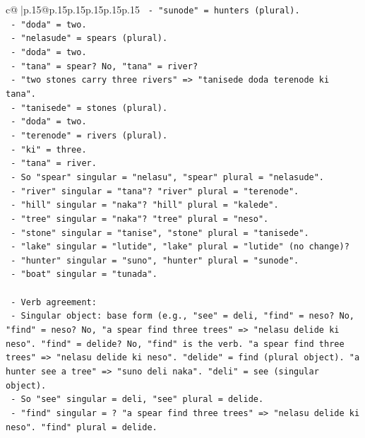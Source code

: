 \documentclass{article}
\begin{document}
{\begin{supertabular}{c@{$\;$}|p{.15\linewidth}@{}p{.15\linewidth}p{.15\linewidth}p{.15\linewidth}p{.15\linewidth}p{.15\linewidth}}
{{{\texttt{       {-} "sunode" = hunters (plural).} \\
\texttt{       {-} "doda" = two.} \\
\texttt{       {-} "nelasude" = spears (plural).} \\
\texttt{       {-} "doda" = two.} \\
\texttt{       {-} "tana" = spear? No, "tana" = river?} \\
\texttt{       {-} "two stones carry three rivers" => "tanisede doda terenode ki tana".} \\
\texttt{         {-} "tanisede" = stones (plural).} \\
\texttt{         {-} "doda" = two.} \\
\texttt{         {-} "terenode" = rivers (plural).} \\
\texttt{         {-} "ki" = three.} \\
\texttt{         {-} "tana" = river.} \\
\texttt{       {-} So "spear" singular = "nelasu", "spear" plural = "nelasude".} \\
\texttt{       {-} "river" singular = "tana"? "river" plural = "terenode".} \\
\texttt{       {-} "hill" singular = "naka"? "hill" plural = "kalede".} \\
\texttt{       {-} "tree" singular = "naka"? "tree" plural = "neso".} \\
\texttt{       {-} "stone" singular = "tanise", "stone" plural = "tanisede".} \\
\texttt{       {-} "lake" singular = "lutide", "lake" plural = "lutide" (no change)?} \\
\texttt{       {-} "hunter" singular = "suno", "hunter" plural = "sunode".} \\
\texttt{       {-} "boat" singular = "tunada".} \\
\\ 
\texttt{   {-} Verb agreement:} \\
\texttt{     {-} Singular object: base form (e.g., "see" = deli, "find" = neso? No, "find" = neso? No, "a spear find three trees" => "nelasu delide ki neso". "find" = delide? No, "find" is the verb. "a spear find three trees" => "nelasu delide ki neso". "delide" = find (plural object). "a hunter see a tree" => "suno deli naka". "deli" = see (singular object).} \\
\texttt{     {-} So "see" singular = deli, "see" plural = delide.} \\
\texttt{     {-} "find" singular = ? "a spear find three trees" => "nelasu delide ki neso". "find" plural = delide.} \\
}}}
\end{supertabular}}
\end{document}

